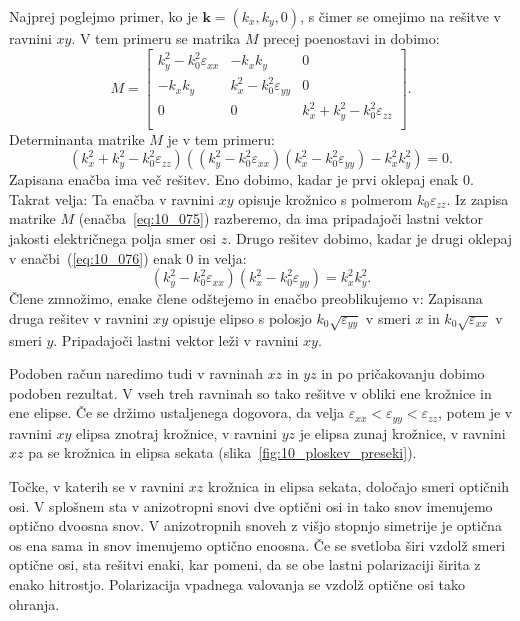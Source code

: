 Najprej poglejmo primer, ko je 
$\mathbf{k}= (k_x,k_y, 0)$, s čimer se omejimo na rešitve v ravnini $xy$. 
V tem primeru se matrika $M$ precej poenostavi in dobimo:
\begin{equation}
M = \left[\begin{array}{ccc}
k_y^2- k_0^2\varepsilon_{xx} &  - k_xk_y & 0\\
- k_xk_y & k_x^2- k_0^2\varepsilon_{yy} &0\\
0& 0 & k_x^2+k_y^2  - k_0^2\varepsilon_{zz}\\
\end{array}\right]\!\!.
\label{eq:10_075}
\end{equation}
Determinanta matrike $M$ je v tem primeru:
\begin{equation}
\left(k_x^2+k_y^2 - k_0^2\varepsilon_{zz}\right) 
\left((k_y^2- k_0^2\varepsilon_{xx})(k_x^2- k_0^2\varepsilon_{yy})-k_x^2k_y^2\right) = 0.
\label{eq:10_076}
\end{equation}
Zapisana enačba ima več rešitev. Eno dobimo, kadar je prvi oklepaj enak 0. Takrat velja:
Ta enačba v ravnini $xy$ opisuje krožnico s polmerom $k_0\varepsilon_{zz}$. Iz zapisa matrike 
$M$ (enačba~\ref{eq:10_075}) razberemo, da ima pripadajoči 
lastni vektor jakosti električnega polja smer osi $z$.
Drugo rešitev dobimo, kadar je drugi oklepaj v enačbi~(\ref{eq:10_076}) enak 0 in velja:
\begin{equation}
(k_y^2- k_0^2\varepsilon_{xx})(k_x^2- k_0^2\varepsilon_{yy})=k_x^2k_y^2.
\label{eq:10_078}
\end{equation}
Člene zmnožimo, enake člene odštejemo in enačbo preoblikujemo v:
Zapisana druga rešitev v ravnini $xy$ opisuje elipso s polosjo $k_0\sqrt{\varepsilon_{yy}}$ v smeri $x$ in 
$k_0\sqrt{\varepsilon_{xx}}$ v smeri $y$. Pripadajoči lastni vektor leži v ravnini $xy$. 

Podoben račun naredimo tudi v ravninah $xz$ in $yz$ in po pričakovanju dobimo podoben rezultat. V vseh treh
ravninah so tako rešitve v obliki ene krožnice in ene elipse. Če se držimo ustaljenega dogovora, 
da velja $\varepsilon_{xx}<\varepsilon_{yy}<\varepsilon_{zz}$, potem je v ravnini $xy$ elipsa znotraj krožnice,
v ravnini $yz$ je elipsa zunaj krožnice, v ravnini $xz$ pa se krožnica in elipsa sekata 
(slika~\ref{fig:10_ploskev_preseki}).

Točke, v katerih se v ravnini $xz$ krožnica in elipsa sekata, določajo smeri optičnih osi.
V splošnem sta v anizotropni snovi dve optični osi in tako snov imenujemo optično dvoosna 
snov. V
anizotropnih snoveh z višjo stopnjo simetrije je optična os ena sama in snov imenujemo optično 
enoosna. 
Če se svetloba širi vzdolž smeri optične osi, sta rešitvi enaki, kar pomeni, da se obe lastni 
polarizaciji širita z enako hitrostjo. Polarizacija vpadnega valovanja se vzdolž optične osi tako ohranja.

